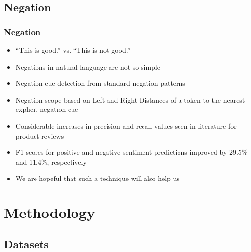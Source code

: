 \documentclass{beamer}
\begin{document}
\subsection{Negation}

\begin{frame}
\frametitle{Negation}
\begin{itemize}
\item ``This is good.'' vs. ``This is not good.''
\item Negations in natural language are not so simple \cite{CMV}
\item Negation cue detection from standard negation patterns
\item Negation scope based on Left and Right Distances of a token to the nearest explicit negation cue
\item Considerable increases in precision and recall values seen in literature for product reviews
\item F1 scores for positive and negative sentiment predictions improved by 29.5\% and 11.4\%, respectively
\item We are hopeful that such a technique will also help us
\end{itemize}
\end{frame}

\section{Methodology}
\subsection{Datasets}
\end{document}
